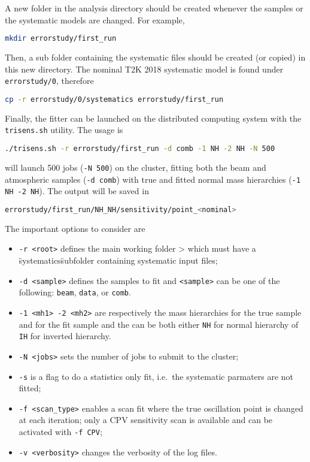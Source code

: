 \documentclass[a4paper, 11pt]{article}
\begin{document}
A new folder in the analysis directory should be created whenever the samples or the systematic models are changed.
For example,
\begin{lstlisting}[language=bash]
	mkdir errorstudy/first_run
\end{lstlisting}
Then, a sub folder containing the systematic files should be created (or copied) in this new directory.
The nominal T2K 2018 systematic model is found under \texttt{errorstudy/0}, therefore
\begin{lstlisting}[language=bash]
	cp -r errorstudy/0/systematics errorstudy/first_run
\end{lstlisting}

Finally, the fitter can be launched on the distributed computing system with %
the \texttt{trisens.sh} utility.
The usage is
\begin{lstlisting}[language=bash]
	./trisens.sh -r errorstudy/first_run -d comb -1 NH -2 NH -N 500
\end{lstlisting}
will launch 500 jobs (\texttt{-N 500}) on the cluster, fitting both the beam and atmospheric samples %
(\texttt{-d comb}) with true and fitted normal mass hierarchies (\texttt{-1 NH -2 NH}).
The output will be saved in
\begin{lstlisting}[language=bash]
	errorstudy/first_run/NH_NH/sensitivity/point_<nominal>
\end{lstlisting}
The important options to consider are
\begin{itemize}
		\small
	\item \texttt{-r <root>} defines the main working folder > which must have a \"systematics\"
		subfolder containing systematic input files;
	\item \texttt{-d <sample>} defines the samples to fit and \texttt{<sample>} can be one of
		the following: \texttt{beam}, \texttt{data}, or \texttt{comb}.
	\item \texttt{-1 <mh1> -2 <mh2>} are respectively the mass hierarchies for the %
		true sample and for the fit sample and the can be both either \texttt{NH} %
		for normal hierarchy of \texttt{IH} for inverted hierarchy.
	\item \texttt{-N <jobs>} sets the number of jobs to submit to the cluster;
	\item \texttt{-s} is a flag to do a statistics only fit, i.e.\ the systematic parmaters are not fitted;
	\item \texttt{-f <scan\_type>} enables a scan fit where the true oscillation point is changed at each iteration; only a CPV sensitivity scan is available and can be activated with \texttt{-f CPV};
	\item \texttt{-v <verbosity>} changes the verbosity of the log files.
\end{itemize}
\end{document}
